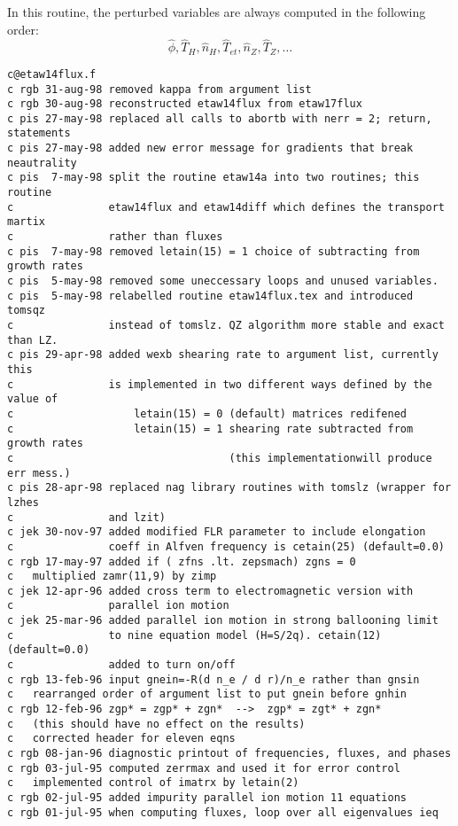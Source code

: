   
In this routine, the perturbed variables are always computed in
the following order:
\[ \hat{\phi}, \hat{T}_H, \hat{n}_H, \hat{T}_{et},
    \hat{n}_Z, \hat{T}_Z, \ldots \]


\begin{verbatim}
c@etaw14flux.f
c rgb 31-aug-98 removed kappa from argument list
c rgb 30-aug-98 reconstructed etaw14flux from etaw17flux
c pis 27-may-98 replaced all calls to abortb with nerr = 2; return, statements
c pis 27-may-98 added new error message for gradients that break neautrality
c pis  7-may-98 split the routine etaw14a into two routines; this routine
c               etaw14flux and etaw14diff which defines the transport martix
c               rather than fluxes
c pis  7-may-98 removed letain(15) = 1 choice of subtracting from growth rates
c pis  5-may-98 removed some uneccessary loops and unused variables.
c pis  5-may-98 relabelled routine etaw14flux.tex and introduced tomsqz 
c               instead of tomslz. QZ algorithm more stable and exact than LZ.
c pis 29-apr-98 added wexb shearing rate to argument list, currently this
c               is implemented in two different ways defined by the value of 
c                   letain(15) = 0 (default) matrices redifened
c                   letain(15) = 1 shearing rate subtracted from growth rates
c                                  (this implementationwill produce err mess.)
c pis 28-apr-98 replaced nag library routines with tomslz (wrapper for lzhes
c               and lzit)
c jek 30-nov-97 added modified FLR parameter to include elongation
c               coeff in Alfven frequency is cetain(25) (default=0.0)
c rgb 17-may-97 added if ( zfns .lt. zepsmach) zgns = 0
c   multiplied zamr(11,9) by zimp
c jek 12-apr-96 added cross term to electromagnetic version with
c               parallel ion motion
c jek 25-mar-96 added parallel ion motion in strong ballooning limit
c               to nine equation model (H=S/2q). cetain(12) (default=0.0)
c               added to turn on/off
c rgb 13-feb-96 input gnein=-R(d n_e / d r)/n_e rather than gnsin
c   rearranged order of argument list to put gnein before gnhin
c rgb 12-feb-96 zgp* = zgp* + zgn*  -->  zgp* = zgt* + zgn*
c   (this should have no effect on the results)
c   corrected header for eleven eqns
c rgb 08-jan-96 diagnostic printout of frequencies, fluxes, and phases
c rgb 03-jul-95 computed zerrmax and used it for error control
c   implemented control of imatrx by letain(2)
c rgb 02-jul-95 added impurity parallel ion motion 11 equations
c rgb 01-jul-95 when computing fluxes, loop over all eigenvalues ieq

\end{verbatim}
